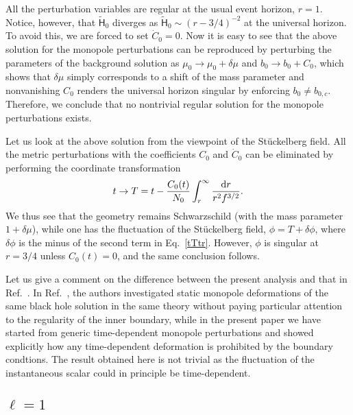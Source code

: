 \documentclass[aps,prd,preprintnumbers,superscriptaddress,nofootinbib,notitlepage]{revtex4-2}
\newcommand*{\D}{{\rm d}}
\begin{document}
All the perturbation variables are regular at the usual event horizon, $r=1$.
Notice, however, that $\widetilde{\mathsf{H}}_0$
diverges as $\widetilde{\mathsf{H}}_0\sim (r-3/4)^{-2}$
at the universal horizon.
To avoid this, we are forced to set $\dot C_0=0$.
Now it is easy to see that the above solution for the monopole perturbations
can be reproduced by perturbing the parameters of the background solution as
$\mu_0\to\mu_0+\delta\mu$ and $b_0\to b_0+C_0$, which shows that
$\delta\mu$ simply corresponds to a shift of the mass parameter
and nonvanishing $C_0$ renders the universal horizon singular by enforcing $b_0\neq b_{0,c}$.
Therefore, we conclude that no nontrivial regular solution for the monopole perturbations exists.





Let us look at the above solution from the viewpoint of the St\"{u}ckelberg field.
All the metric perturbations with the coefficients $C_0$ and $\dot C_0$
can be eliminated by performing the coordinate transformation
\begin{align}
    t\rightarrow T=t-\frac{C_0(t)}{N_0}\int^\infty_r \frac{\D r}{r^2f^{3/2}}.
    \label{tTtr}
\end{align}
We thus see that
the geometry remains Schwarzschild (with the mass parameter $1+\delta\mu$),
while one has the fluctuation of the St\"{u}ckelberg field,
$\phi=T+\delta\phi$, where $\delta\phi$ is the minus of the second term in Eq.~\eqref{tTtr}.
However, $\phi$ is singular at $r=3/4$ unless $C_0(t)=0$,
and the same conclusion follows.






Let us give a comment on the difference between the present analysis and that in Ref.~\cite{Iyonaga:2021yfv}.
In Ref.~\cite{Iyonaga:2021yfv}, the authors investigated static monopole deformations of the same black hole solution in the same theory without paying particular attention to the regularity of the inner boundary, while in the present paper we have started from generic time-dependent monopole perturbations and showed explicitly how any time-dependent deformation is prohibited by the boundary condtions.
The result obtained here is not trivial as the fluctuation of the instantaneous scalar could in principle be time-dependent.




\subsection{$\ell=1$}\label{even-parity:l=1}
\end{document}
